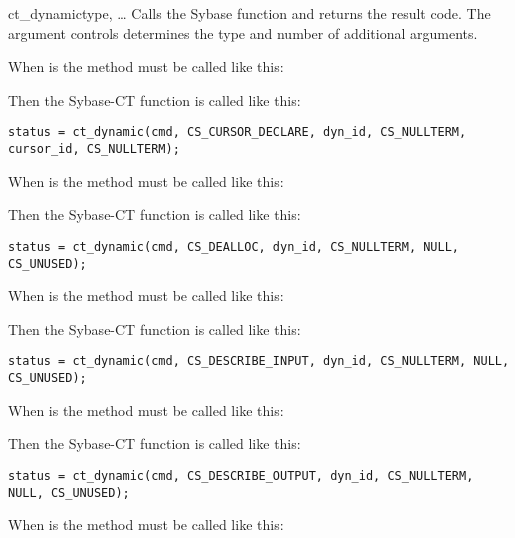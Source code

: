\begin{methoddesc}[CS_COMMAND]{ct_dynamic}{type, \ldots}
Calls the Sybase  function and returns the
result code.  The  argument controls determines the type and
number of additional arguments.

When  is  the method must be called
like this:


Then the Sybase-CT  function is called like
this:

\begin{verbatim}
status = ct_dynamic(cmd, CS_CURSOR_DECLARE, dyn_id, CS_NULLTERM, cursor_id, CS_NULLTERM);
\end{verbatim}

When  is  the method must be called like
this:


Then the Sybase-CT  function is called like
this:

\begin{verbatim}
status = ct_dynamic(cmd, CS_DEALLOC, dyn_id, CS_NULLTERM, NULL, CS_UNUSED);
\end{verbatim}

When  is  the method must be called
like this:


Then the Sybase-CT  function is called like
this:

\begin{verbatim}
status = ct_dynamic(cmd, CS_DESCRIBE_INPUT, dyn_id, CS_NULLTERM, NULL, CS_UNUSED);
\end{verbatim}

When  is  the method must be called
like this:


Then the Sybase-CT  function is called like
this:

\begin{verbatim}
status = ct_dynamic(cmd, CS_DESCRIBE_OUTPUT, dyn_id, CS_NULLTERM, NULL, CS_UNUSED);
\end{verbatim}

When  is  the method must be called like
this:


\end{methoddesc}
